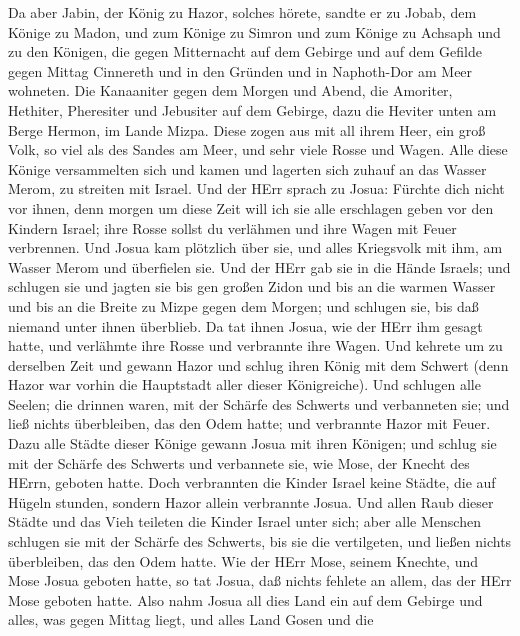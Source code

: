  Da aber Jabin, der König zu Hazor, solches hörete, sandte
er zu Jobab, dem Könige zu Madon, und zum Könige zu Simron und zum
Könige zu Achsaph  und zu den Königen, die gegen Mitternacht
auf dem Gebirge und auf dem Gefilde gegen Mittag Cinnereth und in den
Gründen und in Naphoth-Dor am Meer wohneten.  Die Kanaaniter
gegen dem Morgen und Abend, die Amoriter, Hethiter, Pheresiter und
Jebusiter auf dem Gebirge, dazu die Heviter unten am Berge Hermon, im
Lande Mizpa.  Diese zogen aus mit all ihrem Heer, ein groß
Volk, so viel als des Sandes am Meer, und sehr viele Rosse und Wagen.
 Alle diese Könige versammelten sich und kamen und lagerten
sich zuhauf an das Wasser Merom, zu streiten mit Israel. 
Und der HErr sprach zu Josua: Fürchte dich nicht vor ihnen, denn morgen
um diese Zeit will ich sie alle erschlagen geben vor den Kindern Israel;
ihre Rosse sollst du verlähmen und ihre Wagen mit Feuer verbrennen.
 Und Josua kam plötzlich über sie, und alles Kriegsvolk mit
ihm, am Wasser Merom und überfielen sie.  Und der HErr gab
sie in die Hände Israels; und schlugen sie und jagten sie bis gen großen
Zidon und bis an die warmen Wasser und bis an die Breite zu Mizpe gegen
dem Morgen; und schlugen sie, bis daß niemand unter ihnen überblieb.
 Da tat ihnen Josua, wie der HErr ihm gesagt hatte, und
verlähmte ihre Rosse und verbrannte ihre Wagen.  Und
kehrete um zu derselben Zeit und gewann Hazor und schlug ihren König mit
dem Schwert (denn Hazor war vorhin die Hauptstadt aller dieser
Königreiche).  Und schlugen alle Seelen; die drinnen waren,
mit der Schärfe des Schwerts und verbanneten sie; und ließ nichts
überbleiben, das den Odem hatte; und verbrannte Hazor mit Feuer.
 Dazu alle Städte dieser Könige gewann Josua mit ihren
Königen; und schlug sie mit der Schärfe des Schwerts und verbannete sie,
wie Mose, der Knecht des HErrn, geboten hatte.  Doch
verbrannten die Kinder Israel keine Städte, die auf Hügeln stunden,
sondern Hazor allein verbrannte Josua.  Und allen Raub
dieser Städte und das Vieh teileten die Kinder Israel unter sich; aber
alle Menschen schlugen sie mit der Schärfe des Schwerts, bis sie die
vertilgeten, und ließen nichts überbleiben, das den Odem hatte.
 Wie der HErr Mose, seinem Knechte, und Mose Josua geboten
hatte, so tat Josua, daß nichts fehlete an allem, das der HErr Mose
geboten hatte.  Also nahm Josua all dies Land ein auf dem
Gebirge und alles, was gegen Mittag liegt, und alles Land Gosen und die
